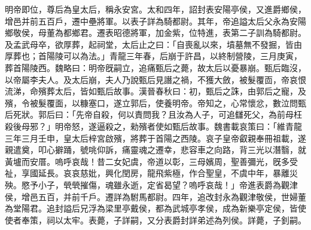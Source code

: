 \begin{pinyinscope}
明帝即位，尊后為皇太后，稱永安宮。太和四年，詔封表安陽亭侯，又進爵鄉侯，增邑并前五百戶，遷中壘將軍。以表子詳為騎都尉。其年，帝追謚太后父永為安陽鄉敬侯，母董為都鄉君。遷表昭德將軍，加金紫，位特進，表第二子訓為騎都尉。及孟武母卒，欲厚葬，起祠堂，太后止之曰：「自喪亂以來，墳墓無不發掘，皆由厚葬也；首陽陵可以為法。」青龍三年春，后崩于許昌，以終制營陵，三月庚寅，葬首陽陵西。魏略曰：明帝旣嗣立，追痛甄后之薨，故太后以憂暴崩。甄后臨沒，以帝屬李夫人。及太后崩，夫人乃說甄后見譖之禍，不獲大斂，被髮覆靣，帝哀恨流涕，命殯葬太后，皆如甄后故事。漢晉春秋曰：初，甄后之誅，由郭后之寵，及殯，令被髮覆面，以糠塞口，遂立郭后，使養明帝。帝知之，心常懷忿，數泣問甄后死狀。郭后曰：「先帝自殺，何以責問我？且汝為人子，可追讎死父，為前母枉殺後母邪？」明帝怒，遂逼殺之，勑殯者使如甄后故事。魏書載哀策曰：「維青龍三年三月壬申，皇太后梓宮啟殯，將葬于首陽之西陵。哀子皇帝叡親奉冊祖載，遂親遣奠，叩心擗踊，號咷仰訴，痛靈魂之遷幸，悲容車之向路，背三光以潛翳，就黃壚而安厝。嗚呼哀哉！昔二女妃虞，帝道以彰，三母嬪周，聖善彌光，旣多受祉，享國延長。哀哀慈妣，興化閏房，龍飛紫極，作合聖皇，不虞中年，暴離災殃。愍予小子，煢煢摧傷，魂雖永逝，定省曷望？嗚呼哀哉！」帝進表爵為觀津侯，增邑五百，并前千戶。遷詳為駙馬都尉。四年，追改封永為觀津敬侯，世婦董為堂陽君。追封謚后兄浮為梁里亭戴侯，都為武城亭孝侯，成為新樂亭定侯，皆使使者奉策，祠以太牢。表薨，子詳嗣，又分表爵封詳弟述為列侯。詳薨，子釗嗣。


\end{pinyinscope}